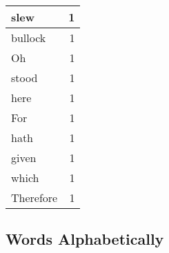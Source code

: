 \begin{center}
\begin{longtable}{l|r}
slew & 1 \\ \hline
bullock & 1 \\ \hline
Oh & 1 \\ \hline
stood & 1 \\ \hline
here & 1 \\ \hline
For & 1 \\ \hline
hath & 1 \\ \hline
given & 1 \\ \hline
which & 1 \\ \hline
Therefore & 1 \\ \hline
\end{longtable}
\end{center}



\normalsize



\subsection{Words Alphabetically}

